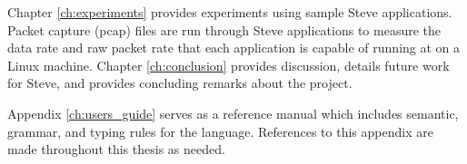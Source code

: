 Chapter \ref{ch:experiments} provides experiments using sample Steve
applications. Packet capture (pcap) files are run through Steve applications to measure the data
rate and raw packet rate that each application is capable of running at on a
Linux machine.
Chapter \ref{ch:conclusion} provides discussion, details future work for Steve, and provides concluding remarks about the project.

Appendix \ref{ch:users_guide} serves as a reference
manual which includes semantic, grammar, and typing rules for the language. References to this appendix are made throughout this thesis as needed.
